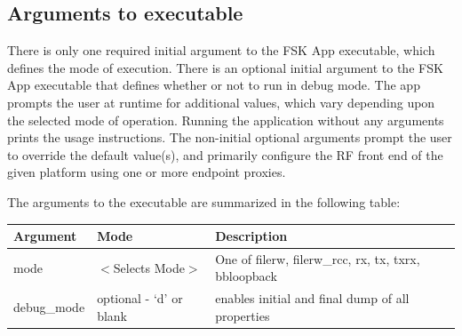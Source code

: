\subsection{Arguments to executable}
There is only one required initial argument to the FSK App executable, which defines the mode of execution. There is an optional initial argument to the FSK App executable that defines whether or not to run in debug mode. The app prompts the user at runtime for additional values, which vary depending upon the selected mode of operation. Running the application without any arguments prints the usage instructions. The non-initial optional arguments prompt the user to override the default value(s), and primarily configure the RF front end of the given platform using one or more endpoint proxies.\\
\medskip
\begin{minipage}{\linewidth}
The arguments to the executable are summarized in the following table:\\
\begin{tabular}{|l|l|l|}
\hline
\rowcolor{blue}
Argument & Mode & Description \\
\hline
mode & $<$Selects Mode$>$ & One of filerw, filerw\_rcc, rx, tx, txrx, bbloopback\\
\hline
debug\_mode & optional - `d' or blank & enables initial and final dump of all properties\\
\hline
\end{tabular}
\end{minipage}
\medskip
